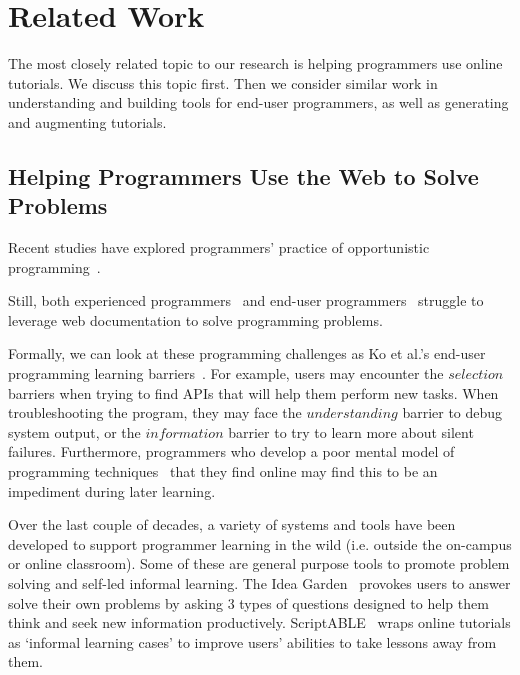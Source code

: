 \section{Related Work}


The most closely related topic to our research is helping programmers use online tutorials.
We discuss this topic first.
Then we consider similar work in understanding and building tools for end-user programmers,
as well as generating and augmenting tutorials.

\subsection{Helping Programmers Use the Web to Solve Problems}

Recent studies have explored programmers' practice of opportunistic programming~\cite{brandt_two_2009}\cite{brandt_example-centric_2010}\cite{hartmann_hacking_2008}.

Still, both experienced programmers~\cite{duala-ekoko_asking_2012} and end-user programmers~\cite{dorn_lost_2013}\cite{dorn_learning_2010}\cite{rosson_everyday_2004} struggle to leverage web documentation to solve programming problems.

Formally, we can look at these programming challenges as Ko et al.'s end-user programming learning barriers~\cite{ko_six_2004}.
For example, users may encounter the $selection$ barriers when trying to find APIs that will help them perform new tasks.
When troubleshooting the program, they may face the $understanding$ barrier to debug system output, or the $information$ barrier to try to learn more about silent failures.
Furthermore, programmers who develop a poor mental model of programming techniques~\cite{winslow_programming_1996} that they find online may find this to be an impediment during later learning.

Over the last couple of decades, a variety of systems and tools have been developed to support programmer learning in the wild
(i.e. outside the on-campus or online classroom).
Some of these are general purpose tools to promote problem solving and self-led informal learning.
The Idea Garden~\cite{cao_barriers_2012}\cite{cao_end-user_2013} provokes users to answer solve their own problems by asking 3 types of questions designed to help them think and seek new information productively.
ScriptABLE~\cite{dorn_scriptable_2011} wraps online tutorials as `informal learning cases' to improve users' abilities to take lessons away from them. 

